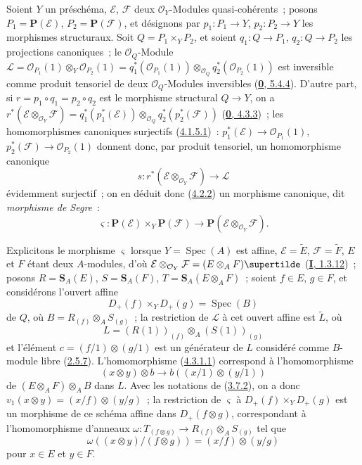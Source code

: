 \begin{env}[4.3.1]
\label{II.4.3.1-fr}
Soient $Y$ un préschéma, $\mathcal{E}$, $\mathcal{F}$ deux
$\mathcal{O}_Y$-Modules quasi-cohérents~; posons
$P_1=\mathbf{P}(\mathcal{E})$, $P_2=\mathbf{P}(\mathcal{F})$, et désignons
par $p_1:P_1\to Y$, $p_2:P_2\to Y$ les morphismes structuraux. Soit
$Q=P_1\times_YP_2$, et soient $q_1:Q\to P_1$, $q_2:Q\to P_2$ les
projections canoniques~; le $\mathcal{O}_Q$-Module
$\mathcal{L}=\mathcal{O}_{P_1}(1)\otimes_Y\mathcal{O}_{P_2}(1)
=q_1^*(\mathcal{O}_{P_1}(1))\otimes_{\mathcal{O}_Q}
q_2^*(\mathcal{O}_{P_2}(1))$
est inversible comme produit tensoriel de deux $\mathcal{O}_Q$-Modules
inversibles (\hyperref[0.5.4.4-fr]{\textbf{0}, 5.4.4}). D'autre part, si
$r=p_1\circ q_1=p_2\circ q_2$ est le morphisme structural $Q\to Y$, on a
$r^*(\mathcal{E}\otimes_{\mathcal{O}_Y}\mathcal{F})
=q_1^*(p_1^*(\mathcal{E}))\otimes_{\mathcal{O}_Q}
q_2^*(p_2^*(\mathcal{F}))$
(\hyperref[0.4.3.3-fr]{\textbf{0}, 4.3.3})~; les homomorphismes canoniques surjectifs
(\hyperref[II.4.1.5.1-fr]{4.1.5.1})~:
$p_1^*(\mathcal{E})\to\mathcal{O}_{P_1}(1)$,
$p_2^*(\mathcal{F})\to\mathcal{O}_{P_2}(1)$ donnent donc, par produit
tensoriel, un homomorphisme canonique
\[
\label{II.4.3.1.1-fr}
  s:r^*(\mathcal{E}\otimes_{\mathcal{O}_Y}\mathcal{F})\longrightarrow
  \mathcal{L}
\tag{4.3.1.1}
\]
évidemment surjectif~; on en déduit donc
(\hyperref[II.4.2.2-fr]{4.2.2}) un morphisme canonique, dit
\emph{morphisme de Segre}~:
\[
\label{II.4.3.1.2-fr}
  \varsigma:\mathbf{P}(\mathcal{E})\times_Y\mathbf{P}(\mathcal{F})
  \longrightarrow
  \mathbf{P}(\mathcal{E}\otimes_{\mathcal{O}_Y}\mathcal{F}).
\tag{4.3.1.2}
\]

Explicitons le morphisme $\varsigma$ lorsque $Y=\operatorname{Spec}(A)$ est
affine, $\mathcal{E}=\widetilde{E}$, $\mathcal{F}=\widetilde{F}$, $E$ et $F$
étant deux $A$-modules, d'où
$\mathcal{E}\otimes_{\mathcal{O}_Y}\mathcal{F}=(E\otimes_A F)\supertilde$
(\hyperref[I.1.3.12-fr]{\textbf{I}, 1.3.12})~; posons
$R=\mathbf{S}_A(E)$, $S=\mathbf{S}_A(F)$,
$T=\mathbf{S}_A(E\otimes_A F)$~; soient $f\in E$, $g\in F$, et considérons
l'ouvert affine
\[
  D_+(f)\times_YD_+(g)=\operatorname{Spec}(B)
\]
de $Q$, où $B=R_{(f)}\otimes_AS_{(g)}$~; la restriction de $\mathcal{L}$ à
cet ouvert affine est $\widetilde{L}$, où
\[
  L=(R(1))_{(f)}\otimes_A(S(1))_{(g)}
\]
et l'élément $c=(f/1)\otimes(g/1)$ est un générateur de $L$ considéré comme
$B$-module libre (\hyperref[II.2.5.7-fr]{2.5.7}). L'homomorphisme
(\hyperref[II.4.3.1.1-fr]{4.3.1.1}) correspond à l'homomorphisme
\[
  (x\otimes y)\otimes b\to b((x/1)\otimes(y/1))
\]
de $(E\otimes_A F)\otimes_AB$ dans $L$. Avec les notations de
(\hyperref[II.3.7.2-fr]{3.7.2}), on a donc
$v_1(x\otimes y)=(x/f)\otimes(y/g)$~; la restriction de $\varsigma$ à
$D_+(f)\times_YD_+(g)$ est un morphisme de ce schéma affine dans
$D_+(f\otimes g)$, correspondant à l'homomorphisme d'anneaux
$\omega:T_{(f\otimes g)}\to R_{(f)}\otimes_AS_{(g)}$ tel que
\[
\label{II.4.3.1.3-fr}
  \omega((x\otimes y)/(f\otimes g))=(x/f)\otimes(y/g)
\tag{4.3.1.3}
\]
pour $x\in E$ et $y\in F$.
\end{env}

